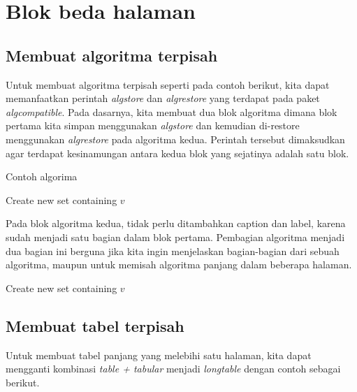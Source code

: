 \chapter{Blok beda halaman}

\section{Membuat algoritma terpisah}

Untuk membuat algoritma terpisah seperti pada contoh berikut, kita dapat memanfaatkan perintah \textit{algstore} dan \textit{algrestore} yang terdapat pada paket \textit{algcompatible}. Pada dasarnya, kita membuat dua blok algoritma dimana blok pertama kita simpan menggunakan \textit{algstore} dan kemudian di-restore menggunakan \textit{algrestore} pada algoritma kedua. Perintah tersebut dimaksudkan agar terdapat kesinamungan antara kedua blok yang sejatinya adalah satu blok. 

\begin{algorithm}
    \caption{Contoh algorima}
    \label{findme}
    \begin{algorithmic} [1]
        \State Create new set containing $v$
        \EndProcedure
    \end{algorithmic}
\end{algorithm}

Pada blok algoritma kedua, tidak perlu ditambahkan caption dan label, karena sudah menjadi satu bagian dalam blok pertama. Pembagian algoritma menjadi dua bagian ini berguna jika kita ingin menjelaskan bagian-bagian dari sebuah algoritma, maupun untuk memisah algoritma panjang dalam beberapa halaman.

\begin{algorithm} 
    \begin{algorithmic} [1]
        \State Create new set containing $v$
        \EndProcedure
    \end{algorithmic}
\end{algorithm}

\newpage  %
\section{Membuat tabel terpisah}

Untuk membuat tabel panjang yang melebihi satu halaman, kita dapat mengganti kombinasi \textit{table + tabular} menjadi \textit{longtable} dengan contoh sebagai berikut.

